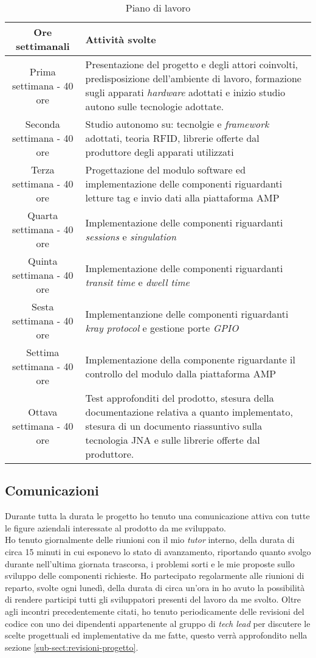 \begin{table}[!h]
\begin{tabularx}{\textwidth}{|c|X|}
\hline
\textbf{Ore settimanali} & \textbf{Attività svolte}\\
\hline
Prima settimana - 40 ore & Presentazione del progetto e degli attori coinvolti, predisposizione dell’ambiente di lavoro, 
formazione sugli apparati \emph{hardware} adottati e inizio studio autono sulle tecnologie adottate. \\
\hline
Seconda settimana - 40 ore & Studio autonomo su: tecnolgie e \emph{framework} adottati, teoria RFID, librerie offerte dal produttore degli apparati utilizzati \\
\hline
Terza settimana - 40 ore & Progettazione del modulo software ed implementazione delle componenti riguardanti letture tag e invio dati alla piattaforma AMP\\
\hline
Quarta settimana - 40 ore & Implementazione delle componenti riguardanti \emph{sessions} e \emph{singulation}\\
\hline
Quinta settimana - 40 ore & Implementazione delle componenti riguardanti \emph{transit time} e \emph{dwell time}\\
\hline
Sesta settimana - 40 ore & Implementanzione delle componenti riguardanti \emph{kray protocol} e gestione porte \emph{GPIO} \\
\hline
Settima settimana - 40 ore & Implementazione della componente riguardante il controllo del modulo dalla piattaforma AMP\\
\hline
Ottava settimana - 40 ore & Test approfonditi del prodotto, stesura della documentazione relativa a quanto implementato, 
stesura di un documento riassuntivo sulla tecnologia JNA e sulle librerie offerte dal produttore.\\
\hline
\end{tabularx}
\caption{Piano di lavoro}
\label{tab:piano-di-lavoro}
\end{table}

\subsection{Comunicazioni}
Durante tutta la durata le progetto ho tenuto una comunicazione attiva con tutte le figure aziendali interessate al prodotto da me sviluppato. \\
Ho tenuto giornalmente delle riunioni con il mio \emph{tutor} interno, della durata di circa 15 minuti in cui esponevo lo stato di avanzamento, riportando
quanto svolgo durante nell'ultima giornata trascorsa, i problemi sorti e le mie proposte sullo sviluppo delle componenti richieste.
Ho partecipato regolarmente alle riunioni di reparto, svolte ogni lunedì, della durata di circa un'ora in ho avuto la possibilità di rendere participi tutti
gli sviluppatori presenti del lavoro da me svolto. %
Oltre agli incontri precedentemente citati, ho tenuto periodicamente delle revisioni del codice con uno dei dipendenti appartenente al gruppo di \emph{tech lead}
per discutere le scelte progettuali ed implementative da me fatte, questo verrà approfondito nella sezione \ref{sub-sect:revisioni-progetto}.

